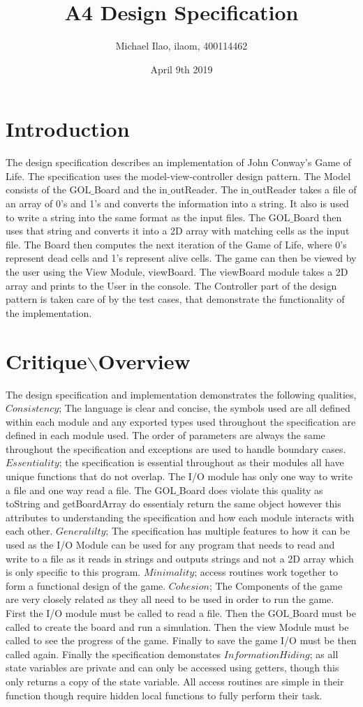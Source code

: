 \documentclass{article}
\title{A4 Design Specification}
\author{Michael Ilao, ilaom, 400114462 }
\date{April 9th 2019}
\begin{document}
\maketitle
\section{Introduction}
The design specification describes an implementation of John Conway's Game of Life. The specification uses the model-view-controller design pattern. The Model consists of the GOL$\_$Board and the in$\_$outReader. The in$\_$outReader takes a file of an array of 0's and 1's and converts the information into a string. It also is used to write a string into the same format as the input files. The GOL$\_$Board then uses that string and converts it into a 2D array with matching cells as the input file. The Board then computes the next iteration of the Game of Life, where 0's represent dead cells and 1's represent alive cells. The game can then be viewed by the user using the View Module, viewBoard. The viewBoard module takes a 2D array and prints to the User in the console. The Controller part of the design pattern is taken care of by the test cases, that demonstrate the functionality of the implementation.

\section{Critique$\backslash$Overview}
The design specification and implementation demonstrates the following qualities, $Consistency$; The language is clear and concise, the symbols used are all defined within each module and any exported types used throughout the specification are defined in each module used. The order of parameters are always the same throughout the specification and exceptions are used to handle boundary cases. $Essentiality$; the specification is essential throughout as their modules all have unique functions that do not overlap. The I/O module has only one way to write a file and one way read a file. The GOL$\_$Board does violate this quality as toString and getBoardArray do essentialy return the same object however this attributes to understanding the specification and how each module interacts with each other. $Generalilty$; The specification has multiple features to how it can be used as the I/O Module can be used for any program that needs to read and write to a file as it reads in strings and outputs strings and not a 2D array which is only specific to this program. $Minimality$; access routines work together to form a functional design of the game. $Cohesion$; The Components of the game are very closely related as they all need to be used in order to run the game. First the I/O module must be called to read a file. Then the GOL$\_$Board must be called to create the board and run a simulation. Then the view Module must be called to see the progress of the game. Finally to save the game I/O must be then called again. Finally the specification demonstates $Information Hiding$; as all state variables are private and can only be accessed using getters, though this only returns a copy of the state variable. All access routines are simple in their function though require hidden local functions to fully perform their task.
\end{document}
